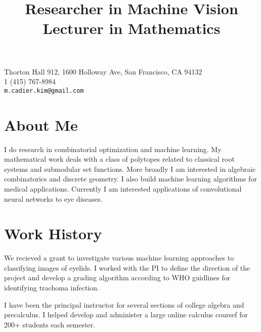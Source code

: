 \documentclass[margin,line,pifont,palatino,courier]{res}
\begin{document}


\begin{resume}




\begin{flushright}
{\small
Thorton Hall 912, 1600 Holloway Ave, San Francisco, CA 94132 \\
1 (415) 767-8984\\
  \verb+m.cadier.kim@gmail.com+
}
\end{flushright}
 
\section{\sc  About Me}
  I do research in combinatorial optimization and machine learning.  My mathematical work deals with a class of polytopes related to classical root systems and submodular set functions. More broadly I am interested in algebraic combinatorics and discrete geometry.  I also build machine learning algorithms for medical applications.  Currently I am interested applications of convolutional neural networks to eye diseases.


\section{\sc  Work History}
  
  
    \title{ Researcher in Machine Vision  }

    \begin{position}
    We recieved a grant to investigate various machine learning approaches to classifying images of eyelids. I worked with the PI to define the direction of the project and develop a grading algorithm according to WHO guidlines for identifying trachoma infection.
    \end{position}
  
    \title{ Lecturer in Mathematics  }

    \begin{position}
    I have been the principal instructor for several sections of college algebra and precalculus.  I helped develop and administer a large online calculus coursef for 200+ students each semester. 
    \end{position}
  

\end{resume}
\end{document}
